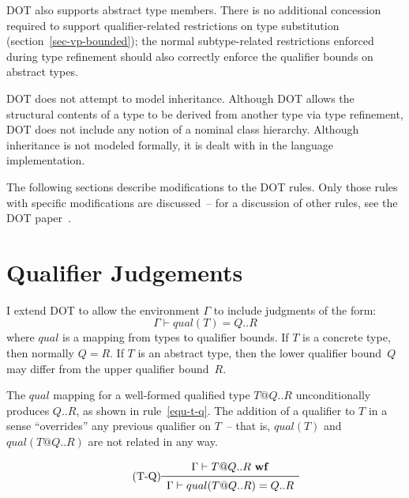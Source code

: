 DOT also supports abstract type members.
There is no additional concession required to support qualifier-related
restrictions on type substitution (section~\ref{sec-vp-bounded});
the normal subtype-related restrictions enforced during type
refinement should also correctly enforce the qualifier bounds
on abstract types.

DOT does not attempt to model inheritance.
Although DOT allows the structural contents of a type to be derived
from another type via type refinement,
DOT does not include any notion of a nominal class hierarchy.
Although inheritance is not modeled formally, it is dealt with in the language implementation.

The following sections describe modifications to the DOT rules.
Only those rules with specific modifications are discussed~--
for a discussion of other rules, see the DOT paper~\cite{dot}.



\section{Qualifier Judgements} \label{sec-qualifier-judgments}

I extend DOT to allow the environment $\Gamma$ to include judgments of the form:
$$\Gamma \vdash qual(T) = Q..R$$
where $qual$ is a mapping from types to qualifier bounds.
If $T$ is a concrete type, then normally \mbox{$Q=R$}.
If $T$ is an abstract type, then the lower qualifier bound~$Q$ may
differ from the upper qualifier bound~$R$.

The $qual$ mapping for a well-formed qualified type \mbox{$T@Q..R$} unconditionally produces
\mbox{$Q..R$},
as shown in rule~\ref{equ-t-q}.
The addition of a qualifier to $T$ in a sense ``overrides'' any previous
qualifier on $T$~-- that is, \mbox{$qual(T)$} and \mbox{$qual(T@Q..R)$} are not related
in any way.

\begin{equation*}\tag{T-Q}\label{equ-t-q}
\begin{array}{c}
\Gamma \vdash T@Q..R\ {\bf wf} \\
\midrule
\Gamma \vdash qual(T@Q..R)=Q..R \\
\end{array}
\end{equation*}

\vspace{0.4cm}

